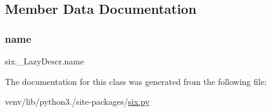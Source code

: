 \subsection{Member Data Documentation}
\mbox{\label{classsix_1_1__LazyDescr_ad45b705c0f4b63da8bcd1311527b2591}} 
\subsubsection{\texorpdfstring{name}{name}}
{\footnotesize\ttfamily six.\+\_\+\+Lazy\+Descr.\+name}



The documentation for this class was generated from the following file\+:\begin{DoxyCompactItemize}
\item 
venv/lib/python3./site-\/packages/\hyperlink{six_8py}{six.\+py}\end{DoxyCompactItemize}
